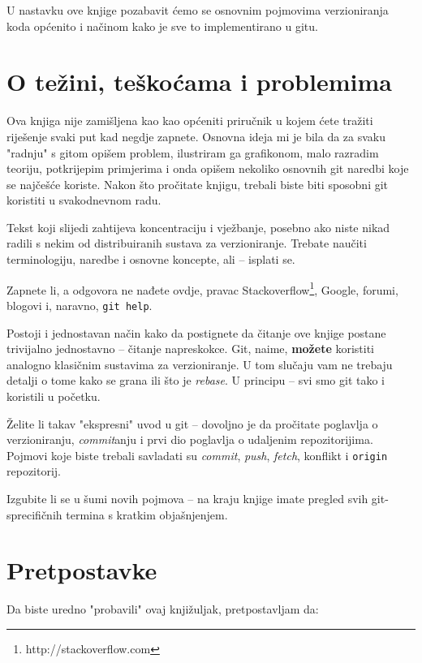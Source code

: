 U nastavku ove knjige pozabavit ćemo se osnovnim pojmovima verzioniranja koda općenito i načinom kako je sve to implementirano u gitu.

\section*{O težini, teškoćama i problemima}

Ova knjiga nije zamišljena kao kao općeniti priručnik u kojem ćete tražiti riješenje svaki put kad negdje zapnete.
Osnovna ideja mi je bila da za svaku "radnju" s gitom opišem problem, ilustriram ga grafikonom, malo razradim teoriju, potkrijepim primjerima i onda opišem nekoliko osnovnih git naredbi koje se najčešće koriste.
Nakon što pročitate knjigu, trebali biste biti sposobni git koristiti u svakodnevnom radu. 

Tekst koji slijedi zahtijeva koncentraciju i vježbanje, posebno ako niste nikad radili s nekim od distribuiranih sustava za verzioniranje.
Trebate naučiti terminologiju, naredbe i osnovne koncepte, ali -- isplati se.

Zapnete li, a odgovora ne nađete ovdje, pravac Stackoverflow\footnote{http://stackoverflow.com}, Google, 
forumi, blogovi i, naravno, \verb+git help+.

Postoji i jednostavan način kako da postignete da čitanje ove knjige postane trivijalno jednostavno -- čitanje napreskokce.
Git, naime, \textbf{možete} koristiti analogno klasičnim sustavima za verzioniranje. 
U tom slučaju vam ne trebaju detalji o tome kako se grana ili što je \emph{rebase}.
U principu -- svi smo git tako i koristili u početku.

Želite li takav "ekspresni" uvod u git -- dovoljno je da pročitate poglavlja o verzioniranju, \emph{commit}anju i prvi dio poglavlja o udaljenim repozitorijima.
Pojmovi koje biste trebali savladati su \emph{commit}, \emph{push}, \emph{fetch}, konflikt i \verb+origin+ repozitorij.

Izgubite li se u šumi novih pojmova -- na kraju knjige imate pregled svih git-sprecifičnih termina s kratkim objašnjenjem.

\section*{Pretpostavke}

Da biste uredno "probavili" ovaj knjižuljak, pretpostavljam da:

